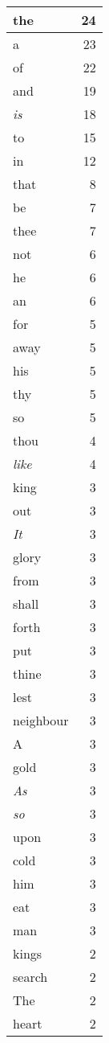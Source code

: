 \begin{center}
\begin{longtable}{l|r}
the & 24\\ \hline 
a & 23\\ \hline 
of & 22\\ \hline 
and & 19\\ \hline 
\emph{is} & 18\\ \hline 
to & 15\\ \hline 
in & 12\\ \hline 
that & 8\\ \hline 
be & 7\\ \hline 
thee & 7\\ \hline 
not & 6\\ \hline 
he & 6\\ \hline 
an & 6\\ \hline 
for & 5\\ \hline 
away & 5\\ \hline 
his & 5\\ \hline 
thy & 5\\ \hline 
so & 5\\ \hline 
thou & 4\\ \hline 
\emph{like} & 4\\ \hline 
king & 3\\ \hline 
out & 3\\ \hline 
\emph{It} & 3\\ \hline 
glory & 3\\ \hline 
from & 3\\ \hline 
shall & 3\\ \hline 
forth & 3\\ \hline 
put & 3\\ \hline 
thine & 3\\ \hline 
lest & 3\\ \hline 
neighbour & 3\\ \hline 
A & 3\\ \hline 
gold & 3\\ \hline 
\emph{As} & 3\\ \hline 
\emph{so} & 3\\ \hline 
upon & 3\\ \hline 
cold & 3\\ \hline 
him & 3\\ \hline 
eat & 3\\ \hline 
man & 3\\ \hline 
kings & 2\\ \hline 
search & 2\\ \hline 
The & 2\\ \hline 
heart & 2\\ \hline 

\end{longtable}
\end{center}
